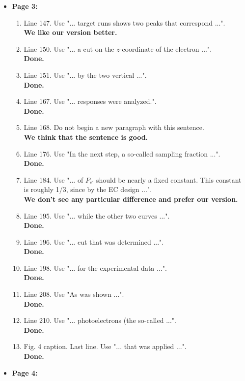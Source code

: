 \documentclass[,superscriptaddress,showpacs,amssymb,amsmath,amsfonts,linenumbers,article]{revtex4-1}
\begin{document}
\begin{itemize}
\item {\bf \large  Page 3:}

\begin{enumerate} 
\item Line 147. Use "... target runs shows two peaks that correspond ...".\\
{\bf We like our version better.}
\item Line 150. Use "... a cut on the $z$-coordinate of the electron ...". \\
{\bf Done.}
\item Line 151. Use "... by the two vertical ...". \\
{\bf Done.}
\item Line 167. Use "... responses were analyzed.". \\
{\bf Done.}
\item Line 168. Do not begin a new paragraph with this sentence.\\
{\bf We think that the sentence is good.}
\item Line 176. Use "In the next step, a so-called sampling fraction ...".\\
{\bf Done.}
\item Line 184. Use "... of $P_{e'}$ should be nearly a fixed constant. This constant is roughly 1/3, since by the EC design ...". \\
{\bf We don't see any particular difference and prefer our version.}
\item Line 195. Use "... while the other two curves ...". \\
{\bf Done.}
\item Line 196. Use "... cut that was determined ...". \\
{\bf Done.}
\item Line 198. Use "... for the experimental data ...". \\
{\bf Done.}
\item Line 208. Use "As was shown ...". \\
{\bf Done.}
\item Line 210. Use "... photoelectrons (the so-called ...". \\
{\bf Done.}
\item Fig. 4 caption. Last line. Use "... that was applied ...". \\
{\bf Done.}

\end{enumerate}


\item {\bf \large  Page 4:}


\end{itemize}
\end{document}
